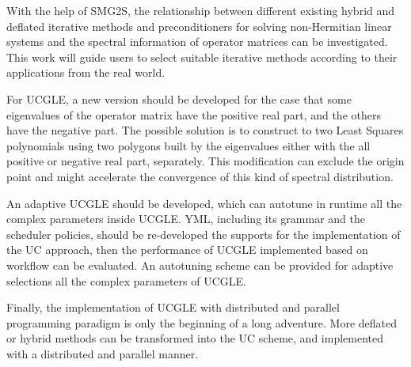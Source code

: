 With the help of SMG2S, the relationship between different existing hybrid and deflated iterative methods and preconditioners for solving non-Hermitian linear systems and the spectral information of operator matrices can be investigated. This work will guide users to select suitable iterative methods according to their applications from the real world.

For UCGLE, a new version should be developed for the case that some eigenvalues of the operator matrix have the positive real part, and the others have the negative part. The possible solution is to construct to two Least Squares polynomials using two polygons built by the eigenvalues either with the all positive or negative real part, separately. This modification can exclude the origin point and might accelerate the convergence of this kind of spectral distribution.

An adaptive UCGLE should be developed, which can autotune in runtime all the complex parameters inside UCGLE. YML, including its grammar and the scheduler policies, should be re-developed the supports for the implementation of the UC approach, then the performance of UCGLE implemented based on workflow can be evaluated. An autotuning scheme can be provided for adaptive selections all the complex parameters of UCGLE.

Finally, the implementation of UCGLE with distributed and parallel programming paradigm is only the beginning of a long adventure. More deflated or hybrid methods can be transformed into the UC scheme, and implemented with a distributed and parallel manner. 


\clearemptydoublepage

\backmatter

\clearemptydoublepage